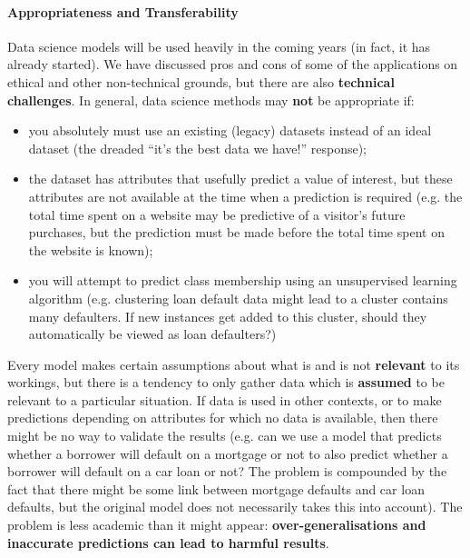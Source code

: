\paragraph{Appropriateness and Transferability}
Data science models will be used heavily in the coming years (in fact, it has already started). We have discussed pros and cons of some of the applications on ethical and other non-technical grounds, but there are also \textbf{technical challenges}. In general, data science methods may \textbf{not} be appropriate if: 
\begin{itemize}[noitemsep]
\item you absolutely must use an existing (legacy) datasets instead of an ideal dataset (the dreaded ``it's the best data we have!'' response);
\item the dataset has attributes that usefully predict a value of interest, but these attributes are not available at the time when a prediction is required (e.g. the total time spent on a website may be predictive of a visitor's future purchases, but the prediction must be made before the total time spent on the website is known);
\item you will attempt to predict class membership using an unsupervised learning algorithm (e.g. clustering loan default data might lead to a cluster contains many defaulters. If new instances get added to this cluster, should they automatically be viewed as loan defaulters?) 
\end{itemize}
Every model makes certain assumptions about what is and is not \textbf{relevant} to its workings, but there is a tendency to only gather data which is \textbf{assumed} to be relevant to a particular situation. If data is used in other contexts, or to make predictions depending on attributes for which no data is available, then there might be no way to validate the results (e.g. can we use a model that predicts whether a borrower will default on a mortgage or not to also predict whether a borrower will default on a car loan or not? The problem is compounded by the fact that there might be some link between mortgage defaults and car loan defaults, but the original model does not necessarily takes this into account). The problem is less academic than it might appear: \textbf{over-generalisations and inaccurate predictions can lead to harmful results}.
